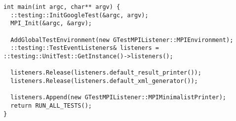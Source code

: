 \documentclass{report}
\begin{document}
\begin{lstlisting}
int main(int argc, char** argv) {
  ::testing::InitGoogleTest(&argc, argv);
  MPI_Init(&argc, &argv);

  AddGlobalTestEnvironment(new GTestMPIListener::MPIEnvironment);
  ::testing::TestEventListeners& listeners = ::testing::UnitTest::GetInstance()->listeners();

  listeners.Release(listeners.default_result_printer());
  listeners.Release(listeners.default_xml_generator());

  listeners.Append(new GTestMPIListener::MPIMinimalistPrinter);
  return RUN_ALL_TESTS();
}
\end{lstlisting}
\end{document}
